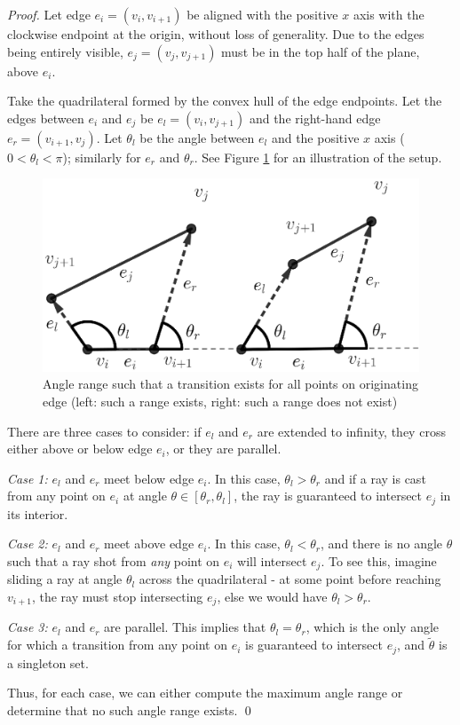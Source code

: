 \documentclass[sageh,times,Review]{sagej}
\begin{document}
\begin{proof}

Let edge $e_i = (v_i, v_{i+1})$ be aligned with the positive $x$ axis with the clockwise
endpoint at the origin, without loss of generality. 
Due to the edges being
entirely visible, $e_j = (v_j, v_{j+1})$ must be in the top half of the plane, above
$e_i$.

Take the quadrilateral formed by the convex hull of the edge endpoints.
Let the edges between $e_i$ and $e_j$ be $e_l = (v_i, v_{j+1})$ and the right-hand edge 
$e_r = (v_{i+1}, v_j)$. Let $\theta_{l}$ be
the angle between $e_l$ and the positive $x$ axis ($0 < \theta_l < \pi$); similarly
for $e_r$ and $\theta_r$. See Figure \ref{fig:bounce_range} for an illustration of
the setup. 

\begin{figure}
    \centering
    \includegraphics[width=0.8\columnwidth]{bouncerange_min.eps}
    \caption{Angle range such that a transition exists for all points on
originating edge (left: such a range exists, right: such a range does not
exist)}
\label{fig:bounce_range}
\end{figure}


There are three cases to consider: if $e_l$ and $e_r$ are extended to infinity,
they cross either above or below edge $e_i$, or they are parallel.

\emph{Case 1:} $e_l$ and $e_r$ meet below edge $e_i$. In this case,
$\theta_l > \theta_r$ and if a ray is cast from any point on $e_i$ at angle
$\theta \in [\theta_r, \theta_l]$, the ray is guaranteed to intersect $e_j$ in its
interior.

\emph{Case 2:} $e_l$ and $e_r$ meet above edge $e_i$. In this case, $\theta_l <
\theta_r$, and there is no angle
$\theta$ such that a ray shot from \emph{any} point on $e_i$ will intersect
$e_j$.
To see this, imagine sliding a ray at angle $\theta_l$ across the quadrilateral
- at some point before reaching $v_{i+1}$, the ray must stop intersecting $e_j$,
else we would have $\theta_l > \theta_r$.

\emph{Case 3:} $e_l$ and $e_r$ are parallel. This implies that $\theta_{l} =
\theta_{r}$, which is the only angle for which a transition from any
point on $e_i$ is guaranteed to intersect $e_j$, and $\tilde{\theta}$ is a
singleton set.

Thus, for each case, we can either compute the maximum angle range or determine
that no such angle range exists. \qed

\end{proof}
\end{document}
